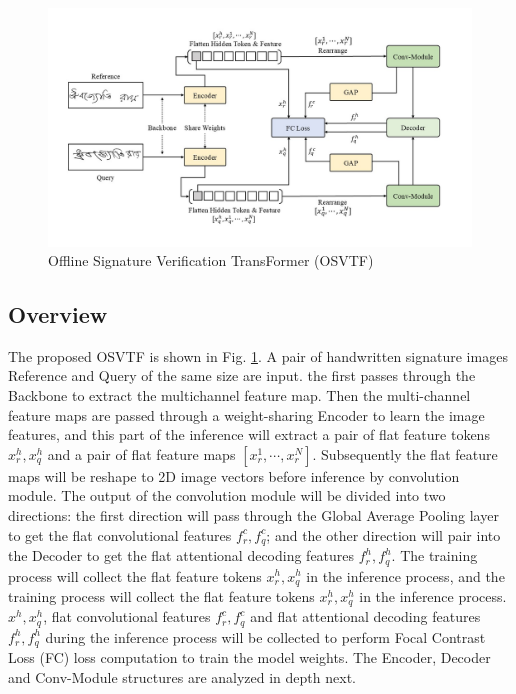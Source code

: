 \documentclass{article}
\begin{document}
\begin{figure}[htbp]
	\centering
	\includegraphics[scale=0.45]{figure/p1.jpg}
	\caption{Offline Signature Verification TransFormer (OSVTF)}\label{fig:p1}
\end{figure}

\subsection{Overview}

The proposed OSVTF is shown in Fig. \ref{fig:p1}. A pair of handwritten signature images Reference and Query of the same size are input. the first passes through the Backbone to extract the multichannel feature map. Then the multi-channel feature maps are passed through a weight-sharing Encoder to learn the image features, and this part of the inference will extract a pair of flat feature tokens $x_r^h,x_q^h$ and a pair of flat feature maps $[x_r^1,\cdots,x_r^N]$. Subsequently the flat feature maps will be reshape to 2D image vectors before inference by convolution module. The output of the convolution module will be divided into two directions: the first direction will pass through the Global Average Pooling layer to get the flat convolutional features $f_r^c,f_q^c$; and the other direction will pair into the Decoder to get the flat attentional decoding features $f_r^h,f_q^h$. The training process will collect the flat feature tokens $x_r^h,x_q^h$ in the inference process, and the training process will collect the flat feature tokens $x_r^h,x_q^h$ in the inference process. $x^h,x_q^h$, flat convolutional features $f_r^c ,f_q^c$ and flat attentional decoding features $f_r^h,f_q^h$ during the inference process will be collected to perform Focal Contrast Loss (FC) loss computation to train the model weights. The Encoder, Decoder and Conv-Module structures are analyzed in depth next.
\end{document}
